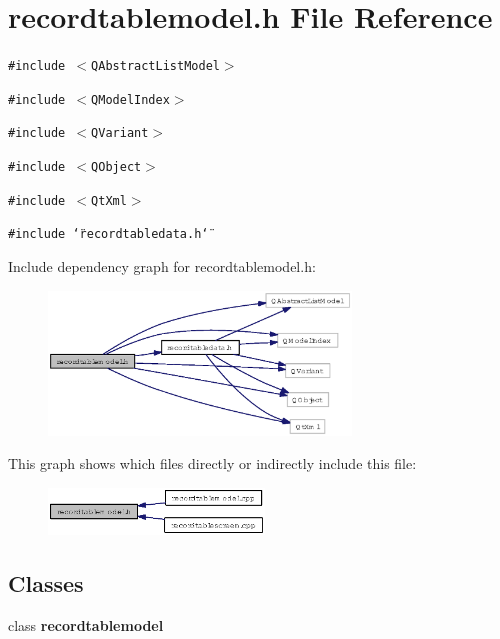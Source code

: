 \section{recordtablemodel.h File Reference}
\label{recordtablemodel_8h}
{\tt \#include $<$QAbstract\-List\-Model$>$}\par
{\tt \#include $<$QModel\-Index$>$}\par
{\tt \#include $<$QVariant$>$}\par
{\tt \#include $<$QObject$>$}\par
{\tt \#include $<$Qt\-Xml$>$}\par
{\tt \#include \char`\"{}recordtabledata.h\char`\"{}}\par


Include dependency graph for recordtablemodel.h:\begin{figure}[H]
\begin{center}
\leavevmode
\includegraphics[width=228pt]{recordtablemodel_8h__incl}
\end{center}
\end{figure}


This graph shows which files directly or indirectly include this file:\begin{figure}[H]
\begin{center}
\leavevmode
\includegraphics[width=163pt]{recordtablemodel_8h__dep__incl}
\end{center}
\end{figure}
\subsection*{Classes}
\begin{CompactItemize}
\item 
class {\bf recordtablemodel}
\end{CompactItemize}
